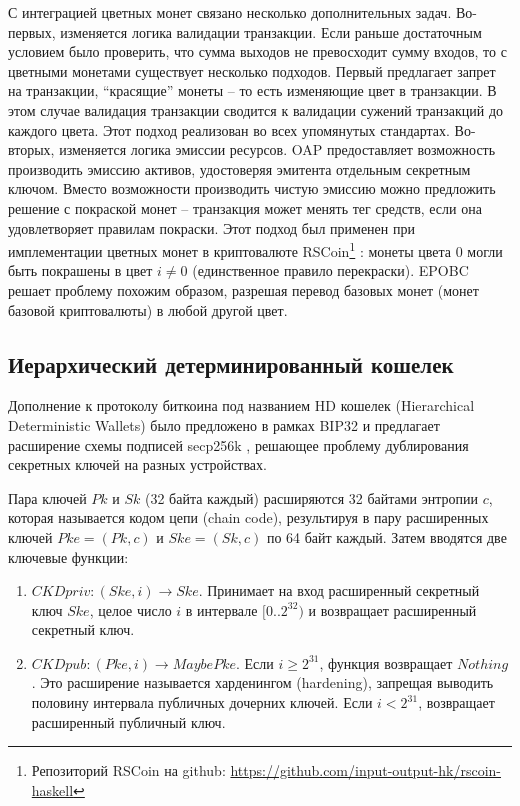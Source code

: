 \documentclass[specification,annotation]{itmo-student-thesis}
\begin{document}
С интеграцией цветных монет связано несколько дополнительных
задач. Во-первых, изменяется логика валидации транзакции. Если раньше
достаточным условием было проверить, что сумма выходов не превосходит
сумму входов, то с цветными монетами существует несколько
подходов. Первый предлагает запрет на транзакции, ``красящие'' монеты
-- то есть изменяющие цвет в транзакции. В этом случае валидация
транзакции сводится к валидации сужений транзакций до каждого
цвета. Этот подход реализован во всех упомянутых
стандартах. Во-вторых, изменяется логика эмиссии ресурсов. OAP
предоставляет возможность производить эмиссию активов, удостоверяя
эмитента отдельным секретным ключом. Вместо возможности производить
чистую эмиссию можно предложить решение с покраской монет --
транзакция может менять тег средств, если она удовлетворяет правилам
покраски. Этот подход был применен при имплементации цветных монет в
криптовалюте RSCoin\footnote{Репозиторий RSCoin на github:
  \url{https://github.com/input-output-hk/rscoin-haskell}}
\cite{danezis2015centrally}: монеты цвета $0$ могли быть покрашены в
цвет $i \neq 0$ (единственное правило перекраски). EPOBC решает
проблему похожим образом, разрешая перевод базовых монет (монет
базовой криптовалюты) в любой другой цвет.

\subsection{Иерархический детерминированный кошелек}

Дополнение к протоколу биткоина под названием HD кошелек (Hierarchical
Deterministic Wallets) было предложено в рамках BIP32 \cite{hdwallets}
и предлагает расширение схемы подписей secp256k \cite{sec20002},
решающее проблему дублирования секретных ключей на разных устройствах.

Пара ключей $Pk$ и $Sk$ (32 байта каждый) расширяются 32 байтами
энтропии $c$, которая называется кодом цепи (chain code), результируя
в пару расширенных ключей $Pke = (Pk, c)$ и $Ske = (Sk, c)$ по 64 байт
каждый. Затем вводятся две ключевые функции:

\begin{enumerate}
\item $CKDpriv : (Ske, i) \rightarrow Ske$. Принимает на вход расширенный
  секретный ключ $Ske$, целое число $i$ в интервале $[0..2^{32})$ и
  возвращает расширенный секретный ключ.
\item $CKDpub : (Pke, i) \rightarrow Maybe Pke$. Если $i \geq 2^{31}$, функция
  возвращает $Nothing$. Это расширение называется харденингом
  (hardening), запрещая выводить половину интервала публичных дочерних
  ключей. Если $i < 2^{31}$, возвращает расширенный публичный ключ.
\end{enumerate}
\end{document}
